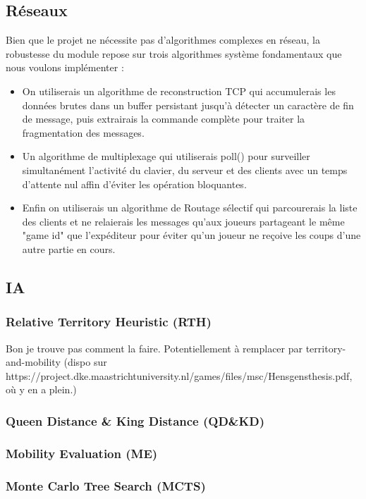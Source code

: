 \documentclass[12pt,a4paper,titlepage,oneside]{article}
\begin{document}
    \subsection{Réseaux}
    Bien que le projet ne nécessite pas d'algorithmes complexes en réseau, la robustesse du module repose sur trois algorithmes système fondamentaux que nous voulons implémenter :
    \begin{itemize}
        \item On utiliserais un algorithme de reconstruction TCP qui accumulerais les données brutes dans un buffer persistant jusqu'à détecter un caractère de fin de message, puis extrairais la commande complète pour traiter la fragmentation des messages.
        \item Un algorithme de multiplexage qui utiliserais poll() pour surveiller simultanément l'activité du clavier, du serveur et des clients avec un temps d'attente nul affin d'éviter les opération bloquantes.
        \item Enfin on utiliserais  un algorithme de Routage sélectif qui parcourerais la liste des clients et ne relaierais les messages qu'aux joueurs partageant le même "game id" que l'expéditeur pour éviter qu'un joueur ne reçoive les coups d'une autre partie en cours.
    \end{itemize}
    
    \subsection{IA}
    \subsubsection{Relative Territory Heuristic (RTH)}
        Bon je trouve pas comment la faire. Potentiellement à remplacer par territory-and-mobility (dispo sur https://project.dke.maastrichtuniversity.nl/games/files/msc/Hensgens\textunderscore thesis.pdf, où y en a plein.)
    \subsubsection{Queen Distance \& King Distance (QD\&KD)}    
    \subsubsection{Mobility Evaluation (ME)}
    \subsubsection{Monte Carlo Tree Search (MCTS)}
\end{document}
